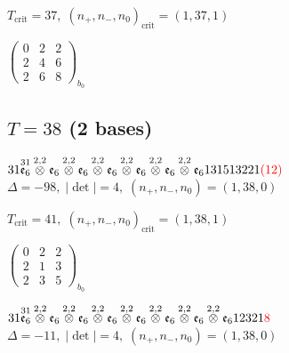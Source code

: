 \documentclass[10pt]{article}
\begin{document}
\hspace{1em}$T_{\text{crit}}=37,\; (n_+,n_-,n_0)_{\text{crit}}=(1,37,1)$

\hspace{2em}$\left(\begin{smallmatrix}0 & 2 & 2 \\ 2 & 4 & 6 \\ 2 & 6 & 8\end{smallmatrix}\right)_{\!b_0}$


\subsection*{$T = 38$ \quad (2 bases)}
\smallskip

$31\overset{31}{\mathfrak{e}_6}\overset{2,2}{\otimes}\mathfrak{e}_6\overset{2,2}{\otimes}\mathfrak{e}_6\overset{2,2}{\otimes}\mathfrak{e}_6\overset{2,2}{\otimes}\mathfrak{e}_6\overset{2,2}{\otimes}\mathfrak{e}_6\overset{2,2}{\otimes}\mathfrak{e}_6131513221\textcolor{red}{(12)}$ \quad $\Delta=-98,\; |\det|=4,\; (n_+,n_-,n_0)=(1,38,0)$

\hspace{1em}$T_{\text{crit}}=41,\; (n_+,n_-,n_0)_{\text{crit}}=(1,38,1)$

\hspace{2em}$\left(\begin{smallmatrix}0 & 2 & 2 \\ 2 & 1 & 3 \\ 2 & 3 & 5\end{smallmatrix}\right)_{\!b_0}$

\smallskip

$31\overset{31}{\mathfrak{e}_6}\overset{2,2}{\otimes}\mathfrak{e}_6\overset{2,2}{\otimes}\mathfrak{e}_6\overset{2,2}{\otimes}\mathfrak{e}_6\overset{2,2}{\otimes}\mathfrak{e}_6\overset{2,2}{\otimes}\mathfrak{e}_6\overset{2,2}{\otimes}\mathfrak{e}_6\overset{2,2}{\otimes}\mathfrak{e}_612321\textcolor{red}{8}$ \quad $\Delta=-11,\; |\det|=4,\; (n_+,n_-,n_0)=(1,38,0)$
\end{document}
